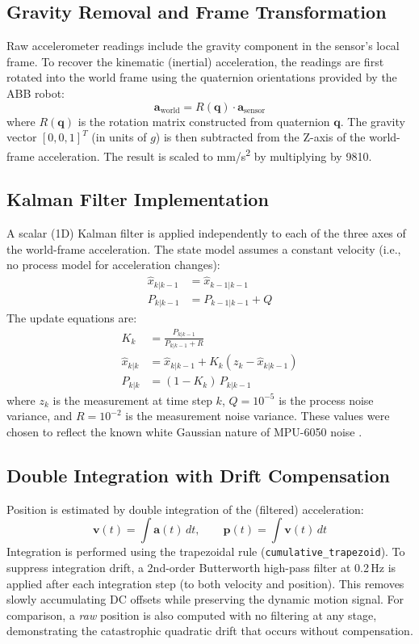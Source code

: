 \documentclass[12pt,a4paper]{article}
\begin{document}
\subsection{Gravity Removal and Frame Transformation}
Raw accelerometer readings include the gravity component in the sensor's local frame. To recover the kinematic (inertial) acceleration, the readings are first rotated into the world frame using the quaternion orientations provided by the ABB robot:
\begin{equation}
    \mathbf{a}_\text{world} = R(\mathbf{q}) \cdot \mathbf{a}_\text{sensor}
\end{equation}
where $R(\mathbf{q})$ is the rotation matrix constructed from quaternion $\mathbf{q}$. The gravity vector $[0, 0, 1]^T$ (in units of $g$) is then subtracted from the Z-axis of the world-frame acceleration. The result is scaled to mm/s\textsuperscript{2} by multiplying by 9810.

\subsection{Kalman Filter Implementation}
A scalar (1D) Kalman filter is applied independently to each of the three axes of the world-frame acceleration. The state model assumes a constant velocity (i.e., no process model for acceleration changes):
\begin{align}
    \hat{x}_{k|k-1} &= \hat{x}_{k-1|k-1} \\
    P_{k|k-1} &= P_{k-1|k-1} + Q
\end{align}
The update equations are:
\begin{align}
    K_k &= \frac{P_{k|k-1}}{P_{k|k-1} + R} \\
    \hat{x}_{k|k} &= \hat{x}_{k|k-1} + K_k \left(z_k - \hat{x}_{k|k-1}\right) \\
    P_{k|k} &= (1 - K_k)\, P_{k|k-1}
\end{align}
where $z_k$ is the measurement at time step $k$, $Q = 10^{-5}$ is the process noise variance, and $R = 10^{-2}$ is the measurement noise variance. These values were chosen to reflect the known white Gaussian nature of MPU-6050 noise \cite{nirmala2016}.

\subsection{Double Integration with Drift Compensation}
Position is estimated by double integration of the (filtered) acceleration:
\begin{equation}
    \mathbf{v}(t) = \int \mathbf{a}(t)\, dt, \qquad \mathbf{p}(t) = \int \mathbf{v}(t)\, dt
\end{equation}
Integration is performed using the trapezoidal rule (\texttt{cumulative\_trapezoid}). To suppress integration drift, a 2nd-order Butterworth high-pass filter at 0.2\,Hz is applied after each integration step (to both velocity and position). This removes slowly accumulating DC offsets while preserving the dynamic motion signal. For comparison, a \textit{raw} position is also computed with no filtering at any stage, demonstrating the catastrophic quadratic drift that occurs without compensation.
\end{document}
